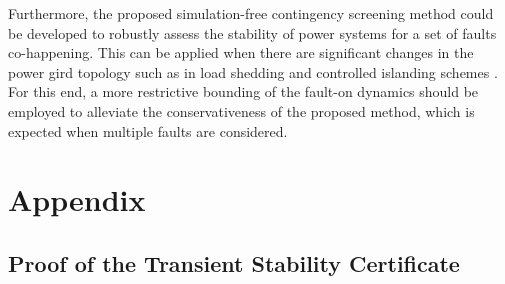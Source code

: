 \documentclass[final]{IEEEtran}
\begin{document}
Furthermore, the proposed simulation-free contingency screening
method could be developed to robustly assess the stability of
power systems for a set of faults co-happening. This can be applied when there are significant changes in the power gird topology such as in
load shedding \cite{7077021,siddiqui2015preventive} and controlled islanding schemes
\cite{januszquiros2014constrained,6774471}. For this end, a
more restrictive bounding of the fault-on dynamics should be
employed to alleviate the conservativeness of the proposed method,
which is expected when multiple faults are considered.




\section{Appendix}

\subsection{Proof of the Transient Stability Certificate}
\label{appen.NewQKH}
\end{document}
